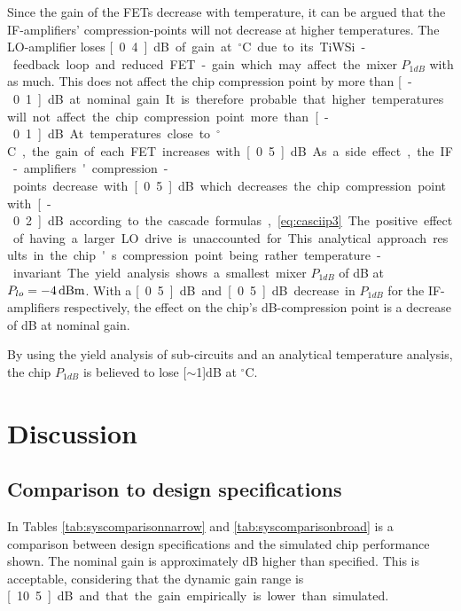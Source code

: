 		Since the gain of the FETs decrease with temperature, it can be argued that the IF-amplifiers' compression-points will not decrease at higher temperatures. The LO-amplifier loses \unit[0.4]{dB} of gain at \unit[55]{$^\circ$C} due to its TiWSi-feedback loop and reduced FET-gain which may affect the mixer $P_{1dB}$ with as much. This does not affect the chip compression point by more than \unit[-0.1]{dB} at nominal gain. It is therefore probable that higher temperatures will not affect the chip compression point more than \unit[-0.1]{dB}. 
		
		At temperatures close to \unit[-40]{$^\circ$C}, the gain of each FET increases with \unit[0.5]{dB}. As a side effect, the IF-amplifiers' compression-points decrease with \unit[0.5]{dB} which decreases the chip compression point with \unit[-0.2]{dB} according to the cascade formulas, \autoref{eq:casciip3}. The positive effect of having a larger LO drive is unaccounted for.	This analytical approach results in the chip's compression point being rather temperature-invariant. The yield analysis shows a smallest mixer $P_{1dB}$ of \unit[10]{dB} at $P_{lo}=\unit[-4]{dBm}$. With a \unit[0.5]{dB} and \unit[0.5]{dB} decrease in $P_{1dB}$ for the IF-amplifiers respectively, the effect on the chip's \unit[1]{dB}-compression point is a decrease of \unit[1]{dB} at nominal gain.
		
		By using the yield analysis of sub-circuits and an analytical temperature analysis, the chip $P_{1dB}$ is believed to lose \unit[$\sim$1]{dB} at \unit[-40]{$^\circ$C}.

	
	\section{Discussion}
		\subsection{Comparison to design specifications}
			In Tables \ref{tab:syscomparisonnarrow} and \ref{tab:syscomparisonbroad} is a comparison between design specifications and the simulated chip performance shown. The nominal gain is approximately \unit[1]{dB} higher than specified. This is acceptable, considering that the dynamic gain range is \unit[10.5]{dB} and that the gain empirically is lower than simulated.
			
